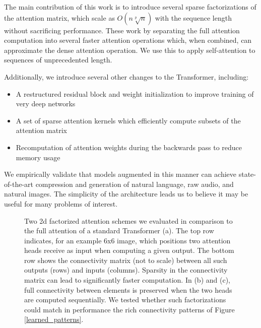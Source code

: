 \documentclass{article}
\begin{document}
The main contribution of this work is to introduce several sparse factorizations of the attention matrix, which scale as $O(n \sqrt[p]{n})$ with the sequence length without sacrificing performance. These work by separating the full attention computation into several faster attention operations which, when combined, can approximate the dense attention operation. We use this to apply self-attention to sequences of unprecedented length.

Additionally, we introduce several other changes to the Transformer, including:

\begin{itemize}
  \item A restructured residual block and weight initialization to improve training of very deep networks
  \item A set of sparse attention kernels which efficiently compute subsets of the attention matrix
  \item Recomputation of attention weights during the backwards pass to reduce memory usage
\end{itemize}

We empirically validate that models augmented in this manner can achieve state-of-the-art compression and generation of natural language, raw audio, and natural images. The simplicity of the architecture leads us to believe it may be useful for many problems of interest.

\begin{figure*}
\centering     {} \qquad \qquad
{} \qquad \qquad
{}
\caption{Two 2d factorized attention schemes we evaluated in comparison to the full attention of a standard Transformer (a). The top row indicates, for an example 6x6 image, which positions two attention heads receive as input when computing a given output. The bottom row shows the connectivity matrix (not to scale) between all such outputs (rows) and inputs (columns). Sparsity in the connectivity matrix can lead to significantly faster computation. In (b) and (c), full connectivity between elements is preserved when the two heads are computed sequentially. We tested whether such factorizations could match in performance the rich connectivity patterns of Figure \ref{learned_patterns}. }
\end{figure*}
\end{document}
